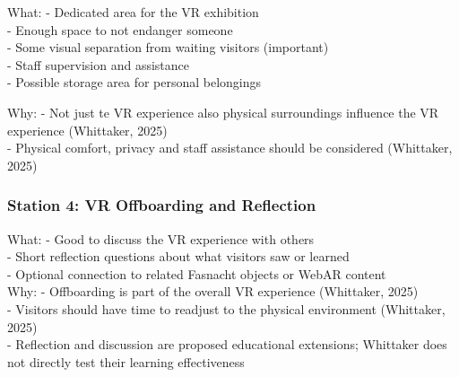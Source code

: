 \documentclass{article}
\begin{document}
What:
- Dedicated area for the VR exhibition
\\
- Enough space to not endanger someone
\\
- Some visual separation from waiting visitors (important)
\\
- Staff supervision and assistance
\\
- Possible storage area for personal belongings

Why:
- Not just te VR experience also physical surroundings influence the VR experience (Whittaker, 2025)
\\
- Physical comfort, privacy and staff assistance should be considered (Whittaker, 2025)
\\

\subsubsection{Station 4: VR Offboarding and Reflection}

What:
- Good to discuss the VR experience with others
\\
- Short reflection questions about what visitors saw or learned
\\
- Optional connection to related Fasnacht objects or WebAR content
\\
Why:
- Offboarding is part of the overall VR experience (Whittaker, 2025)
\\
- Visitors should have time to readjust to the physical environment (Whittaker, 2025)
\\
- Reflection and discussion are proposed educational extensions; Whittaker does not directly test their learning effectiveness
\\
    \newpage
    \printbibliography
\end{document}
